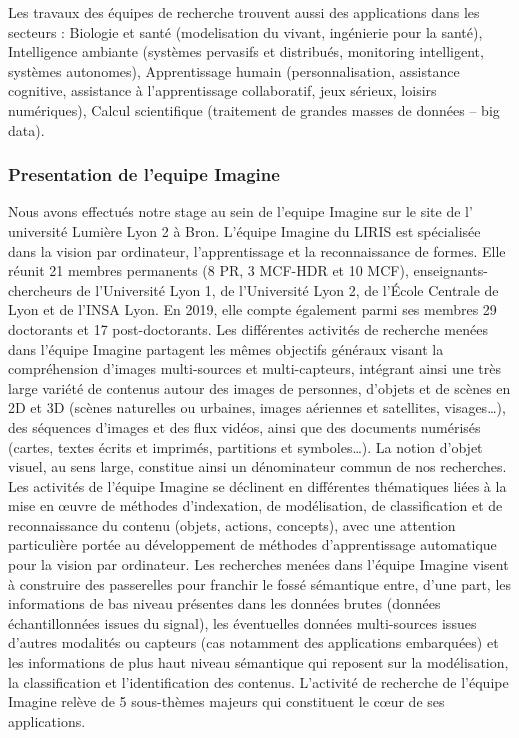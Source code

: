 Les travaux des équipes de recherche trouvent aussi des applications dans les secteurs : 
Biologie et santé (modelisation du vivant, ingénierie pour la santé), Intelligence ambiante 
(systèmes pervasifs et distribués, monitoring intelligent, systèmes autonomes), Apprentissage
humain (personnalisation, assistance cognitive, assistance à l'apprentissage collaboratif, 
jeux sérieux, loisirs numériques), Calcul scientifique (traitement de grandes masses de données
– big data).


\subsubsection{Presentation de l'equipe Imagine}
Nous avons effectués notre stage au sein de l'equipe Imagine sur le site de l'
université Lumière Lyon 2 à Bron.
L’équipe Imagine du LIRIS est spécialisée dans la vision par ordinateur, l’apprentissage 
et la reconnaissance de formes. Elle réunit 21 membres permanents (8 PR, 3 MCF-HDR et 10 MCF), 
enseignants-chercheurs de l’Université Lyon 1, de l’Université Lyon 2, de l’École Centrale de 
Lyon et de l’INSA Lyon.
En 2019, elle compte également parmi ses membres 29 doctorants et 17 post-doctorants.
Les différentes activités de recherche menées dans l’équipe Imagine partagent les mêmes 
objectifs généraux visant la compréhension d’images multi-sources et multi-capteurs, 
intégrant ainsi une très large variété de contenus autour des images de personnes, d’objets 
et de scènes en 2D et 3D (scènes naturelles ou urbaines, images aériennes et satellites, visages…), 
des séquences d’images et des flux vidéos, ainsi que des documents numérisés (cartes, textes écrits et 
imprimés, partitions et symboles…). La notion d’objet visuel, au sens large, constitue ainsi un 
dénominateur commun de nos recherches.
Les activités de l’équipe Imagine se déclinent en différentes thématiques 
liées à la mise en œuvre de méthodes d’indexation, de modélisation, 
de classification et de reconnaissance du contenu (objets, actions, concepts), 
avec une attention particulière portée au développement de méthodes d’apprentissage 
automatique pour la vision par ordinateur.
Les recherches menées dans l’équipe Imagine visent à construire des passerelles pour 
franchir le fossé sémantique entre, d’une part, les informations de bas niveau présentes 
dans les données brutes (données échantillonnées issues du signal), les éventuelles données 
multi-sources issues d’autres modalités ou capteurs (cas notamment des applications embarquées) 
et les informations de plus haut niveau sémantique qui reposent sur la modélisation, la 
classification et l’identification des contenus.
L’activité de recherche de l’équipe Imagine relève de 5 
sous-thèmes majeurs qui constituent le cœur de ses applications.


